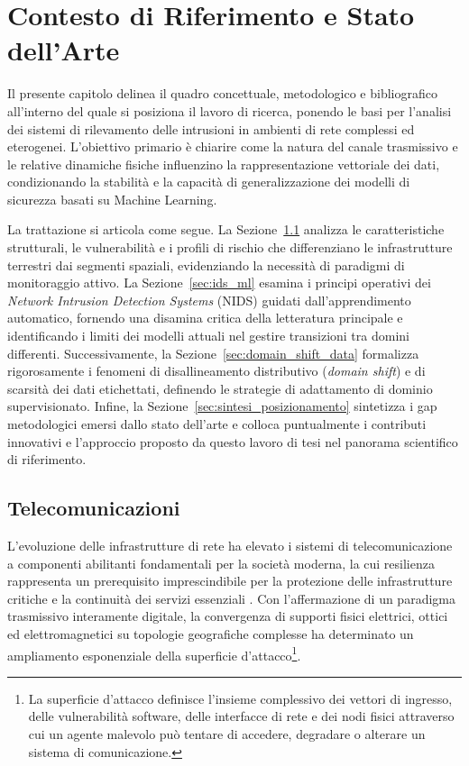 \chapter{Contesto di Riferimento e Stato dell'Arte}
\label{ch:bck_rltd_wrks}

Il presente capitolo delinea il quadro concettuale, metodologico e bibliografico all'interno del quale si posiziona il lavoro di ricerca, ponendo le basi per l'analisi dei sistemi di rilevamento delle intrusioni in ambienti di rete complessi ed eterogenei. 
L'obiettivo primario è chiarire come la natura del canale trasmissivo e le relative dinamiche fisiche influenzino la rappresentazione vettoriale dei dati, condizionando la stabilità e la capacità di generalizzazione dei modelli di sicurezza basati su Machine Learning. 

La trattazione si articola come segue. 
La Sezione~\ref{sec:telecomunicazioni} analizza le caratteristiche strutturali, le vulnerabilità e i profili di rischio che differenziano le infrastrutture terrestri dai segmenti spaziali, evidenziando la necessità di paradigmi di monitoraggio attivo. 
La Sezione~\ref{sec:ids_ml} esamina i principi operativi dei \textit{Network Intrusion Detection Systems} (NIDS) guidati dall'apprendimento automatico, fornendo una disamina critica della letteratura principale e identificando i limiti dei modelli attuali nel gestire transizioni tra domini differenti. 
Successivamente, la Sezione~\ref{sec:domain_shift_data} formalizza rigorosamente i fenomeni di disallineamento distributivo (\textit{domain shift}) e di scarsità dei dati etichettati, definendo le strategie di adattamento di dominio supervisionato. 
Infine, la Sezione~\ref{sec:sintesi_posizionamento} sintetizza i gap metodologici emersi dallo stato dell'arte e colloca puntualmente i contributi innovativi e l'approccio proposto da questo lavoro di tesi nel panorama scientifico di riferimento.

\section{Telecomunicazioni}
\label{sec:telecomunicazioni}

L'evoluzione delle infrastrutture di rete ha elevato i sistemi di telecomunicazione a componenti abilitanti fondamentali per la società moderna, la cui resilienza rappresenta un prerequisito imprescindibile per la protezione delle infrastrutture critiche e la continuità dei servizi essenziali \cite{tanenbaum2020}. 
Con l'affermazione di un paradigma trasmissivo interamente digitale, la convergenza di supporti fisici elettrici, ottici ed elettromagnetici su topologie geografiche complesse ha determinato un ampliamento esponenziale della superficie d'attacco\footnote{La superficie d'attacco definisce l'insieme complessivo dei vettori di ingresso, delle vulnerabilità software, delle interfacce di rete e dei nodi fisici attraverso cui un agente malevolo può tentare di accedere, degradare o alterare un sistema di comunicazione.}.

